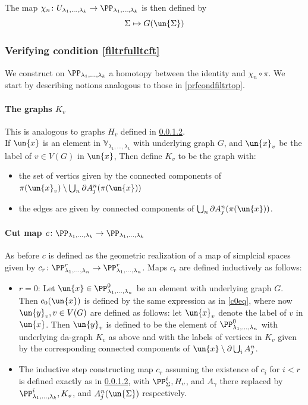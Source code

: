 \documentclass[a4paper,10pt]{amsart}
\begin{document}
The map $\chi_n \colon U_{\lambda_1,...,\lambda_k} \to \PP_{\lambda_1,...,\lambda_k}$ is then defined by 
\[\Sigma \mapsto G(\un{\Sigma}) \]




\subsubsection{Verifying condition \eqref{filtrfulltcft}}
We construct on $\PP_{\lambda_1,...,\lambda_k}$ a homotopy between the identity and $\chi_{n} \circ \pi$. We start by describing notions analogous to those in \ref{prfcondfiltrtop}.

	\paragraph{\textbf{The graphs $K_v$}}
	This is analogous to graphs $H_v$ defined in \ref{}.\\
	If $\un{x}$ is an element in $\mathbb{V}_{\lambda_1,...,\lambda_k}$ with underlying graph $G$, and $\un{x}_v$ be the label of $v \in V(G)$ in $\un{x}$, Then define $K_v$ to be the graph with:
		\begin{itemize}
			\item the set of vertics given by the connected components of $\pi(\un{x}_v) \setminus \bigcup_{n} \partial A^n_j (\pi(\un{x}))$ 
			\item the edges are given by connected components of $\bigcup_{n} \partial A^n_j (\pi(\un{x}))$.  
		\end{itemize}
		
	\paragraph{\textbf{Cut map $c \colon \PP_{\lambda_1,...,\lambda_k} \to \PP_{\lambda_1,...,\lambda_k}$}}
	As before $c$ is defined as the geometric realization of a map of simplcial spaces given by $c_r \colon \PP^r_{\lambda_1,...,\lambda_n} \to\PP^r_{\lambda_1,...,\lambda_n}$. Maps $c_r$ are defined inductively as follows:
		\begin{itemize}
			\item $r=0$: Let $\un{x} \in \PP^0_{\lambda_1,...,\lambda_n}$ be an element with underlying graph $G$. Then $c_0(\un{x})$ is defined by the same expression as in \ref{c0eq}, where now $\un{y}_v, v \in V(G)$ are defined as follows: let $\un{x}_v$ denote the label of $v$ in $\un{x}$. Then $\un{y}_v$ is defined to be the element of $\PP^0_{\lambda_1,...,\lambda_n}$ with underlying da-graph $K_v$ as above and with the labels of vertices in $K_v$ given by the corresponding connected components of $\un{x}\setminus \partial \bigcup_i A^n_j$.
			\item The inductive step constructing map $c_r$ assuming the existence of $c_i$ for $i <r$ is defined exactly as in \ref{}, with $\PP^i_{\Sigma}, H_v$, and $A_\gamma$ there replaced by $\PP^i_{\lambda_1,...,\lambda_k}, K_v$, and $A^n_j(\un{\Sigma})$ respectively.
		\end{itemize}
\end{document}
